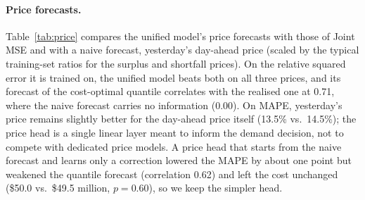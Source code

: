 \paragraph*{Price forecasts.}  Table~\ref{tab:price} compares the unified
model's price forecasts with those of Joint MSE and with a naive forecast,
yesterday's day-ahead price (scaled by the typical training-set ratios for the
surplus and shortfall prices).  On the relative squared error it is trained
on, the unified model beats both on all three prices, and its forecast of the
cost-optimal quantile correlates with the realised one at 0.71, where the
naive forecast carries no information (0.00).  On MAPE, yesterday's price
remains slightly better for the day-ahead price itself (13.5\% vs.\ 14.5\%);
the price head is a single linear layer meant to inform the demand decision,
not to compete with dedicated price models.  A price head that starts from the
naive forecast and learns only a correction lowered the MAPE by about one
point but weakened the quantile forecast (correlation 0.62) and left the cost
unchanged (\$50.0 vs.\ \$49.5 million, $p=0.60$), so we keep the simpler head.

\begin{table}[t]
    \centering
    \small
    \caption{Price forecasts on the test year: MAPE, mean relative squared
             error (RSE, the price head's training loss) and the correlation
             between the predicted and realised cost-optimal quantile
             (mean over three seeds).}
    \label{tab:price}
\end{table}

